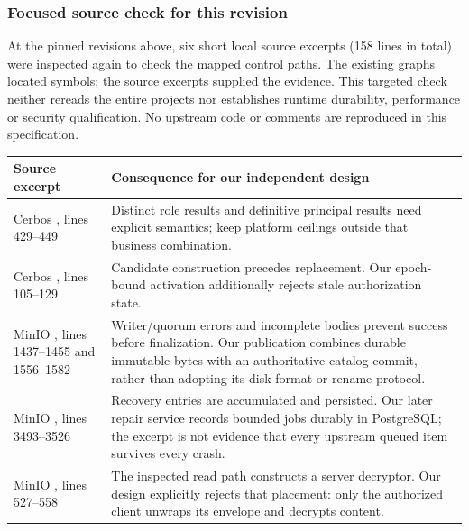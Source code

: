 \subsubsection{Focused source check for this revision}
At the pinned revisions above, six short local source excerpts (158 lines in total) were inspected again to check the mapped control paths. The existing graphs located symbols; the source excerpts supplied the evidence. This targeted check neither rereads the entire projects nor establishes runtime durability, performance or security qualification. No upstream code or comments are reproduced in this specification.

\begin{longtable}{@{}P{0.45\textwidth}P{0.45\textwidth}@{}}
\toprule Source excerpt & Consequence for our independent design\\\midrule\endhead
Cerbos , lines 429--449 & Distinct role results and definitive principal results need explicit semantics; keep platform ceilings outside that business combination.\\
Cerbos , lines 105--129 & Candidate construction precedes replacement. Our epoch-bound activation additionally rejects stale authorization state.\\
MinIO , lines 1437--1455 and 1556--1582 & Writer/quorum errors and incomplete bodies prevent success before finalization. Our publication combines durable immutable bytes with an authoritative catalog commit, rather than adopting its disk format or rename protocol.\\
MinIO , lines 3493--3526 & Recovery entries are accumulated and persisted. Our later repair service records bounded jobs durably in PostgreSQL; the excerpt is not evidence that every upstream queued item survives every crash.\\
MinIO , lines 527--558 & The inspected read path constructs a server decryptor. Our design explicitly rejects that placement: only the authorized client unwraps its envelope and decrypts content.\\
\bottomrule
\end{longtable}

